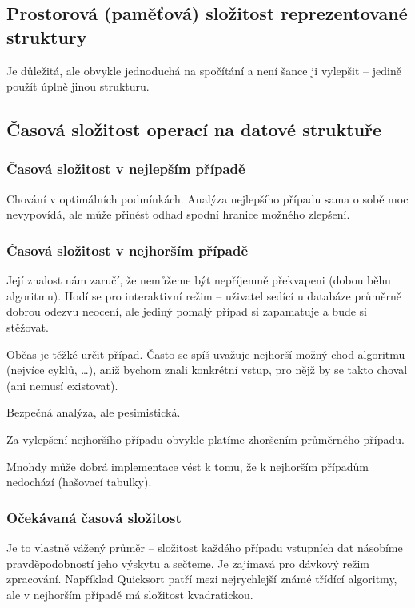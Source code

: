 \documentclass[11pt]{report} %
\numberwithin{equation}{section}
\begin{document}
\subsection{Prostorová (paměťová) složitost reprezentované struktury}
Je důležitá, ale obvykle jednoduchá na spočítání a není šance ji vylepšit -- jedině použít úplně
jinou strukturu. 

\subsection{Časová složitost operací na datové struktuře}
\subsubsection{Časová složitost v nejlepším případě}
Chování v optimálních podmínkách. Analýza nejlepšího případu sama o sobě moc nevypovídá, ale může přinést odhad spodní hranice možného zlepšení.

\subsubsection{Časová složitost v nejhorším případě}
Její znalost nám zaručí, že nemůžeme být nepříjemně překvapeni (dobou běhu algoritmu). Hodí se
pro interaktivní režim -- uživatel sedící u databáze průměrně dobrou odezvu neocení, ale jediný
pomalý případ si zapamatuje a bude si stěžovat. 

Občas je těžké určit  případ. Často se spíš uvažuje nejhorší možný chod algoritmu (nejvíce cyklů, \dots), aniž bychom znali konkrétní vstup, pro nějž by se takto choval (ani nemusí existovat). 

Bezpečná analýza, ale pesimistická. 

Za vylepšení nejhoršího případu obvykle platíme zhoršením průměrného případu.

Mnohdy může dobrá implementace vést k tomu, že k nejhorším případům nedochází (hašovací tabulky).

\subsubsection{Očekávaná časová složitost}
Je to vlastně vážený průměr -- složitost každého případu vstupních dat násobíme pravděpodobností
jeho výskytu a sečteme. Je zajímavá pro dávkový režim zpracování. Například Quicksort patří mezi
nejrychlejší známé třídící algoritmy, ale v nejhorším případě má složitost kvadratickou.
\end{document}
